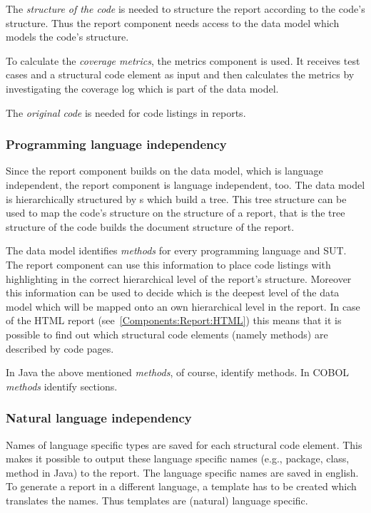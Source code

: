 The \emph{structure of the code} is needed to structure the report according to the code's structure. Thus the report component needs access to the data model which models the code's structure. 

To calculate the \emph{coverage metrics}, the metrics component is used. It receives test cases and a structural code element as input and then calculates the metrics by investigating the coverage log which is part of the data model.

The \emph{original code} is needed for code listings in reports.

\subsubsection{Programming language independency} \label{Components:Report:Independency:Programming}

Since the report component builds on the data model, which is language independent, the report component is language independent, too. The data model is hierarchically structured by s which build a tree. This tree structure can be used to map the code's structure on the structure of a report, that is the tree structure of the code builds the document structure of the report.

The data model identifies \emph{methods} for every programming language and SUT. The report component can use this information to place code listings with highlighting in the correct hierarchical level of the report's structure. Moreover this information can be used to decide which is the deepest level of the data model which will be mapped onto an own hierarchical level in the report. In case of the HTML report (see~\ref{Components:Report:HTML}) this means that it is possible to find out which structural code elements (namely methods) are described by code pages.

In Java the above mentioned \emph{methods}, of course, identify methods. In COBOL \emph{methods} identify sections.

\subsubsection{Natural language independency} \label{Components:Report:Independency:Natural}

Names of language specific types are saved for each structural code element. This makes it possible to output these language specific names (e.g., package, class, method in Java) to the report. The language specific names are saved in english. To generate a report in a different language, a template has to be created which translates the names. Thus templates are (natural) language specific.

